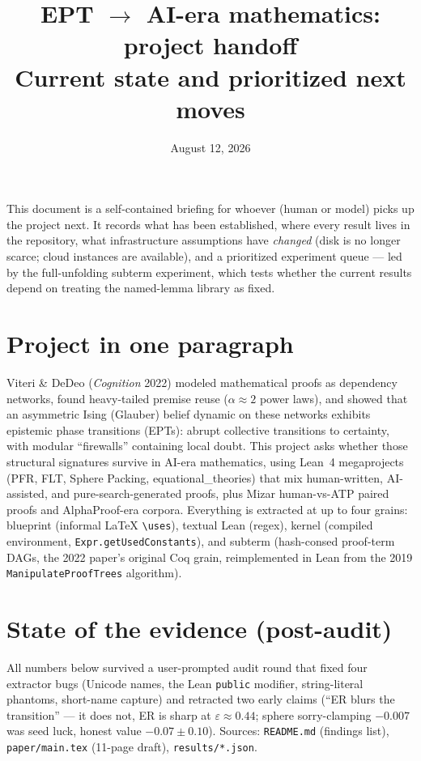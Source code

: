 \documentclass[11pt]{article}
\title{EPT $\to$ AI-era mathematics: project handoff\\
\large Current state and prioritized next moves}
\author{}
\date{August 12, 2026}
\newcommand{\code}[1]{\texttt{#1}}
\begin{document}
\maketitle

\noindent This document is a self-contained briefing for whoever (human or model) picks up the
project next. It records what has been established, where every result lives in the repository,
what infrastructure assumptions have \emph{changed} (disk is no longer scarce; cloud instances are
available), and a prioritized experiment queue --- led by the full-unfolding subterm experiment,
which tests whether the current results depend on treating the named-lemma library as fixed.

\section{Project in one paragraph}

Viteri \& DeDeo (\emph{Cognition} 2022) modeled mathematical proofs as dependency networks,
found heavy-tailed premise reuse ($\alpha\approx 2$ power laws), and showed that an asymmetric
Ising (Glauber) belief dynamic on these networks exhibits epistemic phase transitions (EPTs):
abrupt collective transitions to certainty, with modular ``firewalls'' containing local doubt.
This project asks whether those structural signatures survive in AI-era mathematics, using
Lean~4 megaprojects (PFR, FLT, Sphere Packing, equational\_theories) that mix human-written,
AI-assisted, and pure-search-generated proofs, plus Mizar human-vs-ATP paired proofs and
AlphaProof-era corpora. Everything is extracted at up to four grains: blueprint (informal
\LaTeX{} \code{\textbackslash uses}), textual Lean (regex), kernel (compiled environment,
\code{Expr.getUsedConstants}), and subterm (hash-consed proof-term DAGs, the 2022 paper's
original Coq grain, reimplemented in Lean from the 2019 \code{ManipulateProofTrees} algorithm).

\section{State of the evidence (post-audit)}

All numbers below survived a user-prompted audit round that fixed four extractor bugs
(Unicode names, the Lean \code{public} modifier, string-literal phantoms, short-name capture)
and retracted two early claims (``ER blurs the transition'' --- it does not, ER is sharp at
$\varepsilon\approx0.44$; sphere sorry-clamping $-0.007$ was seed luck, honest value
$-0.07\pm0.10$). Sources: \code{README.md} (findings list), \code{paper/main.tex} (11-page
draft), \code{results/*.json}.
\end{document}
